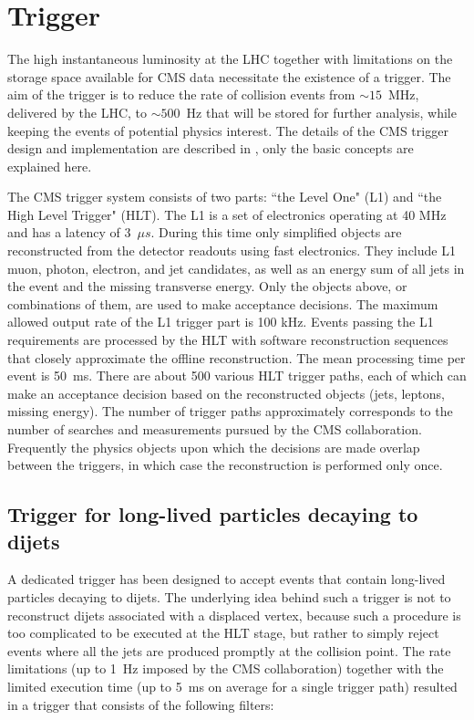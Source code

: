 \section{Trigger}

The high instantaneous luminosity at the LHC together with limitations on the storage space available for
CMS data necessitate the existence of a trigger.
 The aim of the trigger is to reduce the rate
of collision events from $\sim15$~MHz, delivered by the LHC, to $\sim500$~Hz that will be stored
for further analysis, while keeping the events of potential physics interest.
The details of the CMS trigger design and implementation are described in \cite{Cittolin:578006},
only the basic concepts are explained here. 

The CMS trigger system consists of two parts: ``the Level One" (L1) and ``the High Level Trigger" (HLT).
The L1 is a set of electronics operating at 40 MHz and has a latency of 3~$\mu s$. During this
time only simplified 
objects are reconstructed from the detector readouts using fast electronics.
 They include L1 muon, photon, 
electron, and jet candidates, as well as an energy sum of all jets in the event 
and the missing transverse energy.
Only the objects above, or combinations of them, are used to make acceptance decisions. 
The maximum allowed output
rate of the L1 trigger part is 100 kHz. Events passing the L1 requirements are processed by the
HLT with 
software reconstruction sequences that closely approximate
the offline reconstruction. The mean processing time per event is 50~ms. 
There are about 
500 various HLT trigger paths, each of which can make an acceptance decision based 
on the reconstructed objects
(jets, leptons, missing energy). The number of trigger paths approximately corresponds to the
number of searches and measurements pursued by the CMS collaboration.
Frequently the physics objects
upon which the decisions are made overlap between the triggers, in which case the reconstruction 
is performed only once.


\subsection{Trigger for long-lived particles decaying to dijets}
\label{subsec:trigger}

A dedicated trigger has been designed to accept events that contain long-lived particles 
decaying to dijets. 
The underlying idea behind such a trigger is not to reconstruct dijets
associated with a displaced vertex, because such a procedure is too complicated to be executed 
at the HLT stage, but rather to simply reject events where all the jets are produced promptly at the collision
point. The rate limitations (up to 1~Hz imposed by the CMS collaboration)
 together with the limited execution time (up to 5~ms on average for a single trigger path)
resulted in a trigger that consists of the following filters:

